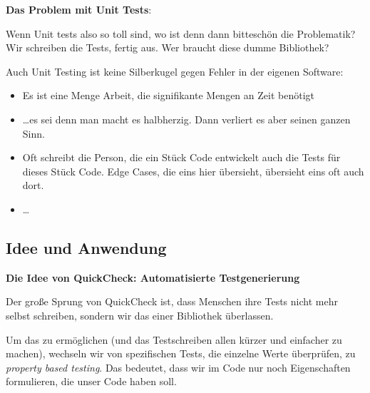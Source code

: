 \documentclass{beamer}
\begin{document}

\begin{frame}
\textbf{Das Problem mit Unit Tests}:
\bigskip

Wenn Unit tests also so toll sind, wo ist denn dann bitteschön die Problematik? Wir schreiben
die Tests, fertig aus. Wer braucht diese dumme Bibliothek?
\pause
\bigskip

Auch Unit Testing ist keine Silberkugel gegen Fehler in der eigenen Software:\pause

\begin{itemize}
\item Es ist eine Menge Arbeit, die signifikante Mengen an Zeit benötigt\pause
\item \dots es sei denn man macht es halbherzig. Dann verliert es aber seinen ganzen Sinn.\pause
\item Oft schreibt die Person, die ein Stück Code entwickelt auch die Tests für dieses Stück Code. Edge Cases, die eins hier übersieht, übersieht eins oft auch dort.\pause
\item \dots
\end{itemize}
\end{frame}

\subsection{Idee und Anwendung}

\begin{frame}
\textbf{Die Idee von QuickCheck: Automatisierte Testgenerierung}
\bigskip

Der große Sprung von QuickCheck ist, dass Menschen ihre Tests nicht mehr selbst schreiben,
sondern wir das einer Bibliothek überlassen. 
\pause 
\smallskip\smallskip

Um das zu ermöglichen (und das Testschreiben allen kürzer und einfacher zu machen), wechseln
wir von spezifischen Tests, die einzelne Werte überprüfen, zu \emph{property based testing}. Das bedeutet, dass wir im Code nur noch Eigenschaften formulieren, die unser Code haben soll.

\end{frame}

\end{document}
